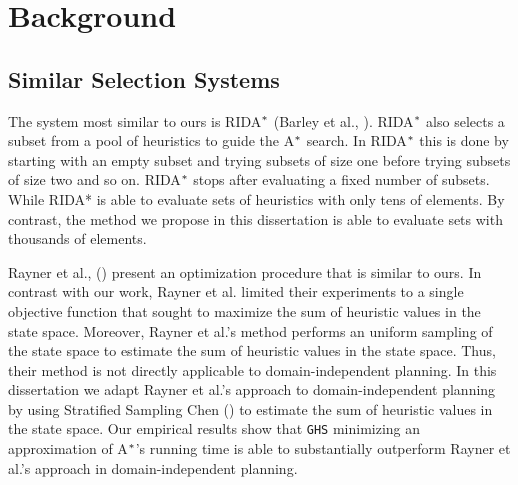 
 
\chapter{Background}\label{ch:background}
\section{Similar Selection Systems}
\noindent
The system most similar to ours is RIDA$\sp{*}$ (Barley et al., \citeyear{BarleySantiagoOver}). RIDA$\sp{*}$ also selects a subset from a pool of heuristics to guide the A$\sp{*}$ search. In RIDA$\sp{*}$ this is done by starting with an empty subset and trying subsets of size one before trying subsets of size two and so on. RIDA$\sp{*}$ stops after evaluating a fixed number of subsets. While RIDA* is able to evaluate sets of heuristics with only tens of elements. By contrast, the method we propose in this dissertation is able to evaluate sets with thousands of elements.

Rayner et al., (\citeyear{raynersss13}) present an optimization procedure that is similar to ours. In contrast with our work, Rayner et al. limited their experiments to a single objective function that sought to maximize the sum of heuristic values in the state space. Moreover, Rayner et al.'s method performs an uniform sampling of the state space to estimate the sum of heuristic values in the state space. Thus, their method is not directly applicable to domain-independent planning. In this dissertation we adapt Rayner et al.'s approach to domain-independent planning by using Stratified Sampling Chen (\citeyear{chen1992heuristic}) to estimate the sum of heuristic values in the state space. Our empirical results show that \texttt{GHS} minimizing an approximation of A$\sp{*}$'s running time is able to substantially outperform Rayner et al.'s approach in domain-independent planning. 

